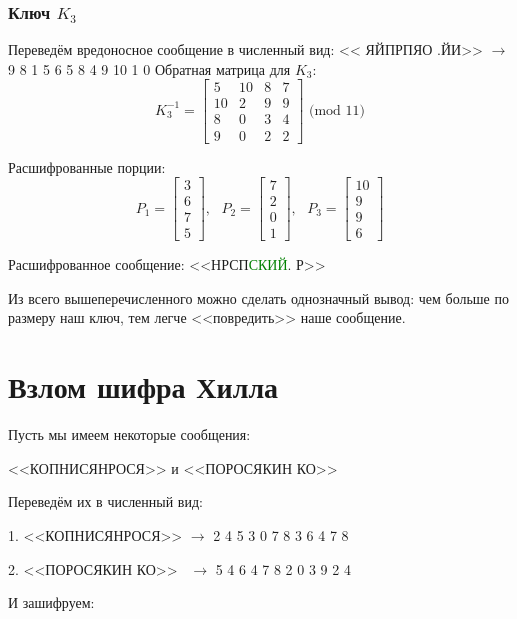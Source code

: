 \documentclass[a4paper,hidelinks,14pt]{extarticle}
\begin{document}
	\subsubsection{Ключ $K_3$}
	Переведём вредоносное сообщение в численный вид: << ЯЙПРПЯО .ЙИ>> $\rightarrow$ 9 8 1 5 6 5 8 4 9 10 1 0
	Обратная матрица для $K_3$:
	$$
	K^{-1}_3 = \begin{bmatrix}
		5 & 10 & 8 & 7 \\
		10 & 2 & 9 & 9 \\
		8 & 0 & 3 & 4 \\
		9 & 0 & 2 & 2
	\end{bmatrix} \text{ (mod 11)}
	$$
	
	Расшифрованные порции:
	$$
	P_1 = \begin{bmatrix}
		3 \\
		6 \\
		7 \\
		5
	\end{bmatrix}, \text{ }
	P_2 = \begin{bmatrix}
		7 \\
		2 \\
		0 \\
		1
	\end{bmatrix}, \text{ }
	P_3 = \begin{bmatrix}
		10 \\
		9 \\
		9 \\
		6
	\end{bmatrix}
	$$
	
	Расшифрованное сообщение: <<НРСП\textcolor{green}{СКИЙ}.  Р>>
	
	Из всего вышеперечисленного можно сделать однозначный вывод: чем больше по размеру наш ключ, тем легче <<повредить>> наше сообщение.
	
	\section{Взлом шифра Хилла}

	
	Пусть мы имеем некоторые сообщения:
	
	<<КОПНИСЯНРОСЯ>> и <<ПОРОСЯКИН КО>>

	Переведём их в численный вид:
	
	1. <<КОПНИСЯНРОСЯ>> $\rightarrow$ 2 4 5 3 0 7 8 3 6 4 7 8
	
	2. <<ПОРОСЯКИН КО>> \ $\rightarrow$ 5 4 6 4 7 8 2 0 3 9 2 4
	
	\vspace{5mm}
	И зашифруем:
	
\end{document}
